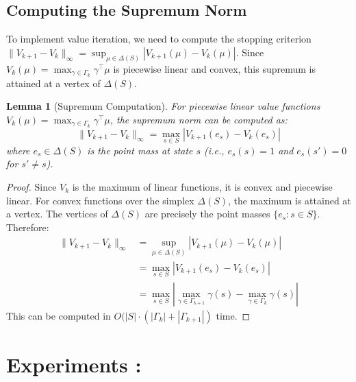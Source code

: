 \documentclass{article}
\newcommand{\ak}[1]{\textcolor{red}{ak: #1}}
\newcommand{\bk}[1]{\textcolor{blue}{: #1}}
\newtheorem{lemma}[theorem]{Lemma}
\begin{document}
\subsection{Computing the Supremum Norm}\label{sec:supremum-computation}

To implement value iteration, we need to compute the stopping criterion $\|V_{k+1} - V_k\|_\infty = \sup_{\mu \in \Delta(S)} |V_{k+1}(\mu) - V_k(\mu)|$. Since $V_k(\mu) = \max_{\gamma \in \Gamma_k} \gamma^\top \mu$ is piecewise linear and convex, this supremum is attained at a vertex of $\Delta(S)$.

\begin{lemma}[Supremum Computation]\label{lem:supremum}
For piecewise linear value functions $V_k(\mu) = \max_{\gamma \in \Gamma_k} \gamma^\top \mu$, the supremum norm can be computed as:
\[
\|V_{k+1} - V_k\|_\infty = \max_{s \in S} |V_{k+1}(e_s) - V_k(e_s)|
\]
where $e_s \in \Delta(S)$ is the point mass at state $s$ (i.e., $e_s(s) = 1$ and $e_s(s') = 0$ for $s' \neq s$).
\end{lemma}

\begin{proof}
Since $V_k$ is the maximum of linear functions, it is convex and piecewise linear. For convex functions over the simplex $\Delta(S)$, the maximum is attained at a vertex. The vertices of $\Delta(S)$ are precisely the point masses $\{e_s : s \in S\}$. Therefore:
\begin{align*}
\|V_{k+1} - V_k\|_\infty &= \sup_{\mu \in \Delta(S)} |V_{k+1}(\mu) - V_k(\mu)| \\
&= \max_{s \in S} |V_{k+1}(e_s) - V_k(e_s)| \\
&= \max_{s \in S} \left|\max_{\gamma \in \Gamma_{k+1}} \gamma(s) - \max_{\gamma \in \Gamma_k} \gamma(s)\right|
\end{align*}
This can be computed in $O(|S| \cdot (|\Gamma_k| +|\Gamma_{k+1}|)$ time.
\end{proof}









\section{Experiments : }
\end{document}
